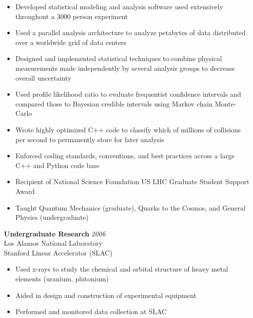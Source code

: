 \documentclass[9pt]{article}
\newenvironment{changemargin}[2]{%
  \begin{list}{}{%
    \setlength{\topsep}{0pt}%
    \setlength{\leftmargin}{#1}%
    \setlength{\rightmargin}{#2}%
    \setlength{\listparindent}{\parindent}%
    \setlength{\itemindent}{\parindent}%
    \setlength{\parsep}{\parskip}%
  }%
  \item[]}{\end{list}
}
\newenvironment{body} {
	\vspace*{-16pt}
	\begin{changemargin}{-0.25in}{-0.5in}
  }	
	{\end{changemargin}
}
\begin{document}
\begin{body}
        \begin{itemize}
        \item Developed statistical modeling and analysis software used extensively throughout a 3000 person experiment
        \item Used a parallel analysis architecture to analyze petabytes of data distributed over a worldwide grid of data centers
        \item Designed and implemented statistical techniques to combine physical measurements made independently by several analysis groups to decrease overall uncertainty
        \item Used profile likelihood ratio to evaluate frequentist confidence intervals and compared those to Bayesian credible intervals using Markov chain Monte-Carlo
        \item Wrote highly optimized C++ code to classify which of millions of collisions per second to permanently store for later analysis
        \item Enforced coding standards, conventions, and best practices across a large C++ and Python code base
        \item Recipient of National Science Foundation US LHC Graduate Student Support Award
        \item Taught Quantum Mechanics (graduate), Quarks to the Cosmos, and General Physics (undergraduate)

        \end{itemize}

        \medskip

	\textbf {Undergraduate Research} \hfill \emph{2006}\\
        Los Alamos National Laboratory \\
        Stanford Linear Accelerator (SLAC) \\

        \begin{itemize}
          \item Used x-rays to study the chemical and orbital structure of heavy metal elements (uranium, plutonium)
          \item Aided in design and construction of experimental equipment
          \item Performed and monitored data collection at SLAC 
        \end{itemize}

\end{body}
\end{document}
